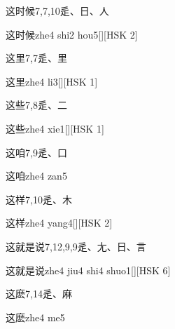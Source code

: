 \begin{Entry}{这时候}{7,7,10}{⾡、⽇、⼈}
  \begin{Phonetics}{这时候}{zhe4 shi2 hou5}[][HSK 2]
  \end{Phonetics}
\end{Entry}

\begin{Entry}{这里}{7,7}{⾡、⾥}
  \begin{Phonetics}{这里}{zhe4 li3}[][HSK 1]
  \end{Phonetics}
\end{Entry}

\begin{Entry}{这些}{7,8}{⾡、⼆}
  \begin{Phonetics}{这些}{zhe4 xie1}[][HSK 1]
  \end{Phonetics}
\end{Entry}

\begin{Entry}{这咱}{7,9}{⾡、⼝}
  \begin{Phonetics}{这咱}{zhe4 zan5}
  \end{Phonetics}
\end{Entry}

\begin{Entry}{这样}{7,10}{⾡、⽊}
  \begin{Phonetics}{这样}{zhe4 yang4}[][HSK 2]
  \end{Phonetics}
\end{Entry}

\begin{Entry}{这就是说}{7,12,9,9}{⾡、⼪、⽇、⾔}
  \begin{Phonetics}{这就是说}{zhe4 jiu4 shi4 shuo1}[][HSK 6]
  \end{Phonetics}
\end{Entry}

\begin{Entry}{这麽}{7,14}{⾡、⿇}
  \begin{Phonetics}{这麽}{zhe4 me5}
  \end{Phonetics}
\end{Entry}

